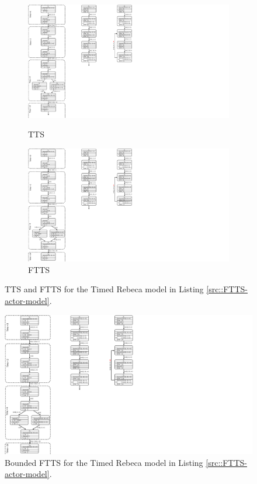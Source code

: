 \begin{figure}
\centering
\begin{subfigure}[b]{0.34\textwidth}
  \centering
  \small{
   \includegraphics[width=.8\textwidth]{resources/TTS.pdf}
  }
  \caption{TTS}
  \label{fig::TTS}
\end{subfigure}
\begin{subfigure}[b]{0.14\textwidth}
  \centering
  \small{
   \includegraphics[width=.8\textwidth]{resources/FTTS.pdf}
   \caption{FTTS}
   \label{fig::FTTS}
  }
\end{subfigure}
\caption{ TTS and FTTS for the Timed Rebeca model in Listing
\ref{src::FTTS-actor-model}.
}
\label{fig::FTTSandTTS}
\end{figure}

\begin{figure}
\centering
\includegraphics[width=.15\textwidth]{resources/BFTTS.pdf}
\caption{ Bounded FTTS for the Timed Rebeca model in Listing \ref{src::FTTS-actor-model}.}
\label{fig::BFTTS}
\end{figure}
